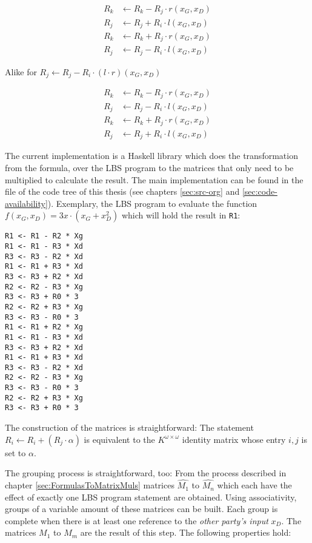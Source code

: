 \begin{align*}
R_k & \leftarrow R_k - R_j \cdot r(x_G, x_D) \\
R_j & \leftarrow R_j + R_i \cdot l(x_G, x_D) \\
R_k & \leftarrow R_k + R_j \cdot r(x_G, x_D) \\
R_j & \leftarrow R_j - R_i \cdot l(x_G, x_D)
\end{align*}

Alike for $R_j \leftarrow R_j - R_i \cdot (l \cdot r)(x_G, x_D)$

\begin{align*}
R_k & \leftarrow R_k - R_j \cdot r(x_G, x_D) \\
R_j & \leftarrow R_j - R_i \cdot l(x_G, x_D) \\
R_k & \leftarrow R_k + R_j \cdot r(x_G, x_D) \\
R_j & \leftarrow R_j + R_i \cdot l(x_G, x_D)
\end{align*}



The current implementation is a Haskell library which does the transformation
from the formula, over the LBS program to the matrices that only need to be
multiplied to calculate the result. The main implementation can be
found in the file  of the code tree of this thesis (see
chapters \ref{sec:src-org} and \ref{sec:code-availability}). Exemplary, the LBS
program to evaluate the function $f(x_G,x_D) = 3x \cdot (x_G + x_D^2)$ which
will hold the result in \texttt{R1}:

\begin{lstlisting}
R1 <- R1 - R2 * Xg
R1 <- R1 - R3 * Xd
R3 <- R3 - R2 * Xd
R1 <- R1 + R3 * Xd
R3 <- R3 + R2 * Xd
R2 <- R2 - R3 * Xg
R3 <- R3 + R0 * 3
R2 <- R2 + R3 * Xg
R3 <- R3 - R0 * 3
R1 <- R1 + R2 * Xg
R1 <- R1 - R3 * Xd
R3 <- R3 + R2 * Xd
R1 <- R1 + R3 * Xd
R3 <- R3 - R2 * Xd
R2 <- R2 - R3 * Xg
R3 <- R3 - R0 * 3
R2 <- R2 + R3 * Xg
R3 <- R3 + R0 * 3
\end{lstlisting}

\noindent{}The construction of the matrices is straightforward: The statement
$R_i \leftarrow R_i + (R_j \cdot \alpha)$ is equivalent to the $K^{\omega \times
\omega}$ identity matrix whose entry $i,j$ is set to $\alpha$.


\label{sec:matrix-grouping}

The grouping process is straightforward, too: From the process described in
chapter \ref{sec:FormulasToMatrixMuls} matrices $\widehat{M_1}$ to
$\widehat{M_n}$ which each have the effect of exactly one LBS program statement
are obtained.  Using associativity, groups of a variable amount of these
matrices can be built. Each group is complete when there is at least one
reference to the \emph{other party's input} $x_D$. The matrices $M_1$ to $M_m$
are the result of this step. The following properties hold:

